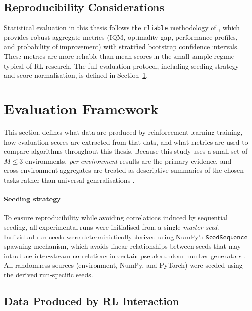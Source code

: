 {\subsection{Reproducibility Considerations}
\label{subsec:rliable}
Statistical evaluation in this thesis follows the \texttt{rliable} methodology of \citet{agarwal2021precipice}, which provides robust aggregate metrics (IQM, optimality gap, performance profiles, and probability of improvement) with stratified bootstrap confidence intervals. These metrics are more reliable than mean scores in the small-sample regime typical of RL research. The full evaluation protocol, including seeding strategy and score normalisation, is defined in Section~\ref{sec:eval-framework}.
}


\section{Evaluation Framework}
\label{sec:eval-framework}

This section defines what data are produced by reinforcement learning training, how evaluation scores are extracted from that data, and what metrics are used to compare algorithms throughout this thesis. Because this study uses a small set of $M \leq 3$ environments, \emph{per-environment} results are the primary evidence, and cross-environment aggregates are treated as descriptive summaries of the chosen tasks rather than universal generalisations \citep{agarwal2021precipice,patterson2024edrl}.

\paragraph{Seeding strategy.}
To ensure reproducibility while avoiding correlations induced by sequential seeding, all experimental runs were initialised from a single \emph{master seed}. Individual run seeds were deterministically derived using NumPy's \texttt{SeedSequence} spawning mechanism, which avoids linear relationships between seeds that may introduce inter-stream correlations in certain pseudorandom number generators \citep{matsumotoCommonDefectsInitialization2007}. All randomness sources (environment, NumPy, and PyTorch) were seeded using the derived run-specific seeds.

\subsection{Data Produced by RL Interaction}
\label{subsec:rl-data}

